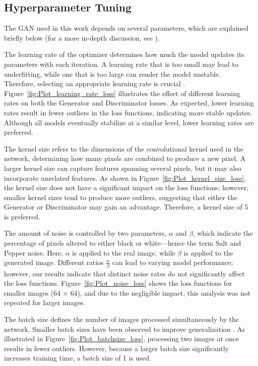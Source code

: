 \subsection{Hyperparameter Tuning}
The GAN used in this work depends on several parameters, which are explained briefly below (for a more in-depth discussion, see \cite{murphy2022probabilistic}).

The learning rate of the optimizer determines how much the model updates its parameters with each iteration. A learning rate that is too small may lead to underfitting, while one that is too large can render the model unstable. Therefore, selecting an appropriate learning rate is crucial \cite{murphy2022probabilistic}. Figure~\ref{fig:Plot_learning_rate_loss} illustrates the effect of different learning rates on both the Generator and Discriminator losses. As expected, lower learning rates result in fewer outliers in the loss functions, indicating more stable updates. Although all models eventually stabilize at a similar level, lower learning rates are preferred.

The kernel size refers to the dimensions of the convolutional kernel used in the network, determining how many pixels are combined to produce a new pixel. A larger kernel size can capture features spanning several pixels, but it may also incorporate unrelated features. As shown in Figure~\ref{fig:Plot_kernel_size_loss}, the kernel size does not have a significant impact on the loss functions; however, smaller kernel sizes tend to produce more outliers, suggesting that either the Generator or Discriminator may gain an advantage. Therefore, a kernel size of 5 is preferred.

The amount of noise is controlled by two parameters, \(\alpha\) and \(\beta\), which indicate the percentage of pixels altered to either black or white—hence the term Salt and Pepper noise. Here, \(\alpha\) is applied to the real image, while \(\beta\) is applied to the generated image. Different ratios \(\frac{\alpha}{\beta}\) can lead to varying model performance; however, our results indicate that distinct noise rates do not significantly affect the loss functions. Figure~\ref{fig:Plot_noise_loss} shows the loss functions for smaller images (64 × 64), and due to the negligible impact, this analysis was not repeated for larger images.

The batch size defines the number of images processed simultaneously by the network. Smaller batch sizes have been observed to improve generalization \cite{prince2023understanding}. As illustrated in Figure~\ref{fig:Plot_batchsize_loss}, processing two images at once results in fewer outliers. However, because a larger batch size significantly increases training time, a batch size of 1 is used.

